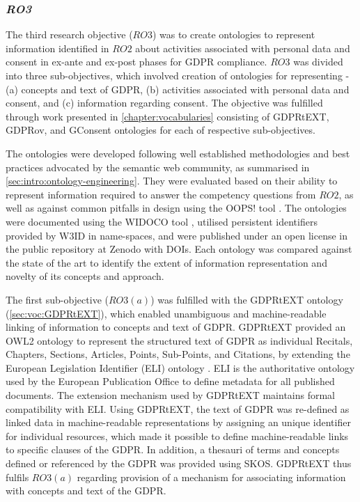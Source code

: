 \subsubsection*{\textit{RO3}}
The third research objective ($RO3$) was to create ontologies to represent information identified in $RO2$ about activities associated with personal data and consent in ex-ante and ex-post phases for GDPR compliance.
$RO3$ was divided into three sub-objectives, which involved creation of ontologies for representing - (a) concepts and text of GDPR, (b) activities associated with personal data and consent, and (c) information regarding consent. 
The objective was fulfilled through work presented in \autoref{chapter:vocabularies} consisting of GDPRtEXT, GDPRov, and GConsent ontologies for each of respective sub-objectives.

The ontologies were developed following well established methodologies \cite{noy_ontology_2001,suarez-figueroa_neon_2012,de_nicola_lightweight_2016} and best practices advocated by the semantic web community, as summarised in \autoref{sec:intro:ontology-engineering}.
They were evaluated based on their ability to represent information required to answer the competency questions \cite{noy_ontology_2001} from $RO2$, as well as against common pitfalls in design using the OOPS! tool \cite{poveda-villalon_oops!_2014}.
The ontologies were documented using the WIDOCO tool \cite{garijo_widoco_2017}, utilised persistent identifiers provided by W3ID in name-spaces, and were published under an open license in the public repository at Zenodo with DOIs.
Each ontology was compared against the state of the art to identify the extent of information representation and novelty of its concepts and approach.

The first sub-objective ($RO3(a)$) was fulfilled with the GDPRtEXT ontology (\autoref{sec:voc:GDPRtEXT}), which enabled unambiguous and machine-readable linking of information to concepts and text of GDPR. GDPRtEXT provided an OWL2 ontology to represent the structured text of GDPR as individual Recitals, Chapters, Sections, Articles, Points, Sub-Points, and Citations, by extending the European Legislation Identifier (ELI) ontology \cite{ELI_2012}. ELI is the authoritative ontology used by the European Publication Office to define metadata for all published documents. The extension mechanism used by GDPRtEXT maintains formal compatibility with ELI. Using GDPRtEXT, the text of GDPR was re-defined as linked data in machine-readable representations by assigning an unique identifier for individual resources, which made it possible to define machine-readable links to specific clauses of the GDPR. In addition, a thesauri  of terms and concepts defined or referenced by the GDPR was provided using SKOS. GDPRtEXT thus fulfils $RO3(a)$ regarding provision of a mechanism for associating information with concepts and text of the GDPR.

